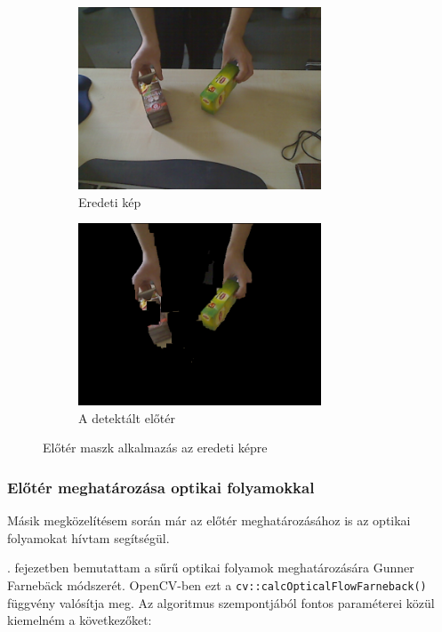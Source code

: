 \begin{figure}[tbh]
\centering
\begin{subfigure}[b]{.49\linewidth}
	\centering
	\includegraphics[width=205pt]{figures/image343.png}
	\caption{Eredeti kép}
  \end{subfigure}
\begin{subfigure}[b]{.49\linewidth}
	\centering
	\includegraphics[width=205pt]{figures/mask343_applied.png}
	\caption{A detektált előtér}
  \end{subfigure}
\caption{Előtér maszk alkalmazás az eredeti képre \label{fig:mask_applied}}
\end{figure}

    \subsubsection{Előtér meghatározása optikai folyamokkal \label{sec:of-mask}}
    
Másik megközelítésem során már az előtér meghatározásához is az optikai folyamokat hívtam segítségül. 

. fejezetben bemutattam a sűrű optikai folyamok meghatározására Gunner Farnebäck módszerét. OpenCV-ben ezt a \texttt{cv::calcOpticalFlowFarneback()} \cite{opencv-mog} függvény valósítja meg. Az algoritmus szempontjából fontos paraméterei közül kiemelném a következőket:

